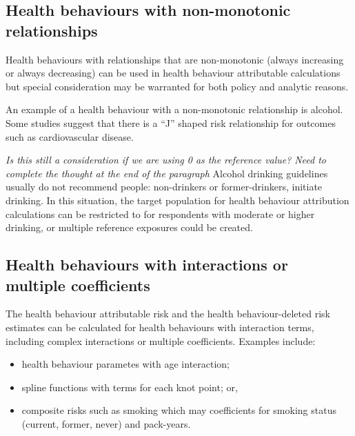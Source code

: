 \documentclass[]{book}
\providecommand{\tightlist}{%
  \setlength{\itemsep}{0pt}\setlength{\parskip}{0pt}}
\begin{document}
\hypertarget{health-behaviours-with-non-monotonic-relationships}{%
\subsection{Health behaviours with non-monotonic relationships}\label{health-behaviours-with-non-monotonic-relationships}}

Health behaviours with relationships that are non-monotonic (always increasing or always decreasing) can be used in health behaviour attributable calculations but special consideration may be warranted for both policy and analytic reasons.

An example of a health behaviour with a non-monotonic relationship is alcohol. Some studies suggest that there is a ``J'' shaped risk relationship for outcomes such as cardiovascular disease.

\emph{Is this still a consideration if we are using 0 as the reference value?}
\emph{Need to complete the thought at the end of the paragraph}
Alcohol drinking guidelines usually do not recommend people: non-drinkers or former-drinkers, initiate drinking. In this situation, the target population for health behaviour attribution calculations can be restricted to for respondents with moderate or higher drinking, or multiple reference exposures could be created.

\hypertarget{health-behaviours-with-interactions-or-multiple-coefficients}{%
\subsection{Health behaviours with interactions or multiple coefficients}\label{health-behaviours-with-interactions-or-multiple-coefficients}}

The health behaviour attributable risk and the health behaviour-deleted risk estimates can be calculated for health behaviours with interaction terms, including complex interactions or multiple coefficients. Examples include:

\begin{itemize}
\tightlist
\item
  health behaviour parametes with age interaction;
\item
  spline functions with terms for each knot point; or,
\item
  composite risks such as smoking which may coefficients for smoking status (current, former, never) and pack-years.
\end{itemize}
\end{document}
